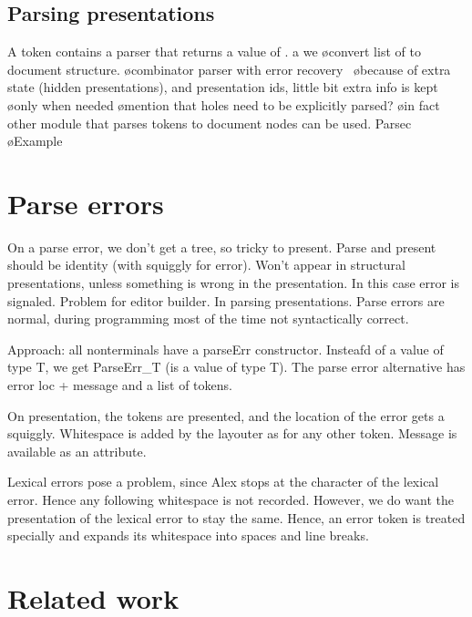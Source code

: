 \documentclass[12pt]{article}
\begin{document}
\subsection{Parsing presentations}

A  token contains a parser that returns a value of .  a  we 
\bl
\o convert list of  to document structure.
\o combinator parser with error recovery~\cite{swierstra03polishParsers, swierstra08parserCombinators}
\o because of extra state (hidden presentations), and presentation ids, little bit extra info is kept
\o only when needed
\o mention that holes need to be explicitly parsed?
\o in fact other module that parses tokens to document nodes can be used. Parsec~\cite{leijen08parsec}
\o Example
\el

\section{Parse errors} \label{sect:parseScanErrors}

On a parse error, we don't get a tree, so tricky to present. Parse and present should be identity (with squiggly for error). Won't appear in structural presentations, unless something is wrong in the presentation. In this case error is signaled. Problem for editor builder. In parsing presentations. Parse errors are normal, during programming most of the time not syntactically correct.

Approach: all nonterminals have a parseErr constructor. Insteafd of a value of type T, we get ParseErr\_T (is a value of type T). The parse error alternative has error loc + message and a list of tokens.

On presentation, the tokens are presented, and the location of the error gets a squiggly. Whitespace is added by the layouter as for any other token. Message is available as an attribute.

Lexical errors pose a problem, since Alex stops at the character of the lexical error. Hence any following whitespace is not recorded. However, we do want the presentation of the lexical error to stay the same. Hence, an error token  is treated specially and expands its whitespace into spaces and line breaks.


%
\section{Related work}
%
\end{document}
